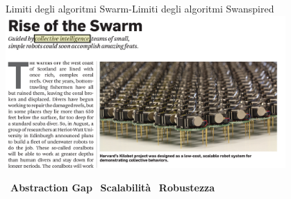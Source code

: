 \documentclass[presentation, 10pt,aspectratio=169]{beamer}\mode<presentation>{\usetheme{AMSBolognaFC}}
\begin{document}
\begin{frame}{Limiti degli algoritmi Swarm-Limiti degli algoritmi Swanspired}
\centering
\includegraphics[width=0.8\textwidth]{img/rise-of-swarm.png}

{\color{red}\faThumbsDown}~\textbf{Abstraction Gap} {\color{red}\faThumbsDown} ~\textbf{Scalabilità} {\color{red}\faThumbsDown} ~\textbf{Robustezza} 
\end{frame}
\end{document}
